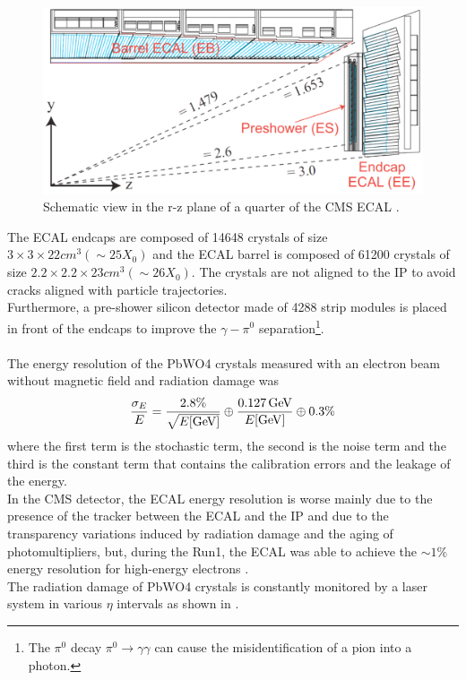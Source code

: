 \begin{figure}[h!]
    \centering
    \includegraphics[width=0.7\linewidth]{fig/chap03-cms/ecal.png}
    \caption{Schematic view in the r-z plane of a quarter of the CMS ECAL \cite{Benaglia2014TheExamples}.}
    \label{fig:ecal}
\end{figure}
The ECAL endcaps are composed of 14648 crystals of size $3\times3\times22 cm^3 (\sim25X_0)$ and the ECAL barrel is composed of 61200 crystals of size $2.2\times2.2\times23 cm^3 (\sim26X_0)$. The crystals are not aligned to the IP to avoid cracks aligned with particle trajectories.\\
Furthermore, a pre-shower silicon detector made of 4288 strip modules is placed in front of the endcaps to improve the $\gamma-\pi^0$ separation\footnote{The $\pi^0$ decay $\pi^0 \to \gamma \gamma$ can cause the misidentification of a pion into a photon.}.
\\
\\
The energy resolution of the PbWO4 crystals measured with an electron beam without magnetic field and radiation damage was \cite{Adzic2007EnergyCalorimeter} 
\begin{equation}
    {\frac{\sigma_{E}}{E}}={\frac{2.8\%}{\sqrt{E[{\mathrm{GeV}}]}}}\oplus{\frac{0.127 {\ensuremath{\,\text{Ge\hspace{-.08em}V}}}}{E[{\mathrm{GeV}}]}}\oplus0.3\%
\end{equation}
where the first term is the stochastic term, the second is the noise term and the third is the constant term that contains the calibration errors and the leakage of the energy.\\
In the CMS detector, the ECAL energy resolution is worse mainly due to the presence of the tracker between the ECAL and the IP and due to the transparency variations induced by radiation damage and the aging of photomultipliers, but, during the Run1, the ECAL was able to achieve the $\sim1\%$ energy resolution for high-energy electrons \cite{Chatrchyan2013EnergyTeV}.\\
The radiation damage of PbWO4 crystals is constantly monitored by a laser system in various $\eta$ intervals as shown in .
